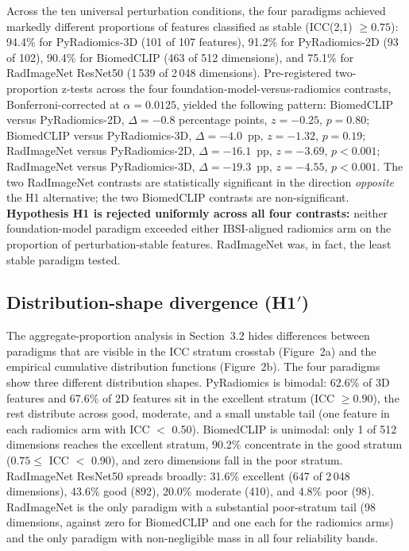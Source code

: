 Across the ten universal perturbation conditions, the four paradigms achieved markedly different proportions of features classified as stable (ICC(2,1) $\geq 0.75$): 94.4\% for PyRadiomics-3D (101 of 107 features), 91.2\% for PyRadiomics-2D (93 of 102), 90.4\% for BiomedCLIP (463 of 512 dimensions), and 75.1\% for RadImageNet ResNet50 (1\,539 of 2\,048 dimensions). Pre-registered two-proportion z-tests across the four foundation-model-versus-radiomics contrasts, Bonferroni-corrected at $\alpha = 0.0125$, yielded the following pattern: BiomedCLIP versus PyRadiomics-2D, $\Delta = -0.8$ percentage points, $z = -0.25$, $p = 0.80$; BiomedCLIP versus PyRadiomics-3D, $\Delta = -4.0$~pp, $z = -1.32$, $p = 0.19$; RadImageNet versus PyRadiomics-2D, $\Delta = -16.1$~pp, $z = -3.69$, $p < 0.001$; RadImageNet versus PyRadiomics-3D, $\Delta = -19.3$~pp, $z = -4.55$, $p < 0.001$. The two RadImageNet contrasts are statistically significant in the direction \emph{opposite} the H1 alternative; the two BiomedCLIP contrasts are non-significant. \textbf{Hypothesis H1 is rejected uniformly across all four contrasts:} neither foundation-model paradigm exceeded either IBSI-aligned radiomics arm on the proportion of perturbation-stable features. RadImageNet was, in fact, the least stable paradigm tested.

\subsection{Distribution-shape divergence (\texorpdfstring{H1$'$}{H1-prime})}

The aggregate-proportion analysis in Section~3.2 hides differences between paradigms that are visible in the ICC stratum crosstab (Figure~2a) and the empirical cumulative distribution functions (Figure~2b). The four paradigms show three different distribution shapes. PyRadiomics is bimodal: 62.6\% of 3D features and 67.6\% of 2D features sit in the excellent stratum (ICC $\geq 0.90$), the rest distribute across good, moderate, and a small unstable tail (one feature in each radiomics arm with ICC $<$ 0.50). BiomedCLIP is unimodal: only 1 of 512 dimensions reaches the excellent stratum, 90.2\% concentrate in the good stratum ($0.75 \leq$ ICC $<$ 0.90), and zero dimensions fall in the poor stratum. RadImageNet ResNet50 spreads broadly: 31.6\% excellent (647 of 2\,048 dimensions), 43.6\% good (892), 20.0\% moderate (410), and 4.8\% poor (98). RadImageNet is the only paradigm with a substantial poor-stratum tail (98 dimensions, against zero for BiomedCLIP and one each for the radiomics arms) and the only paradigm with non-negligible mass in all four reliability bands.

